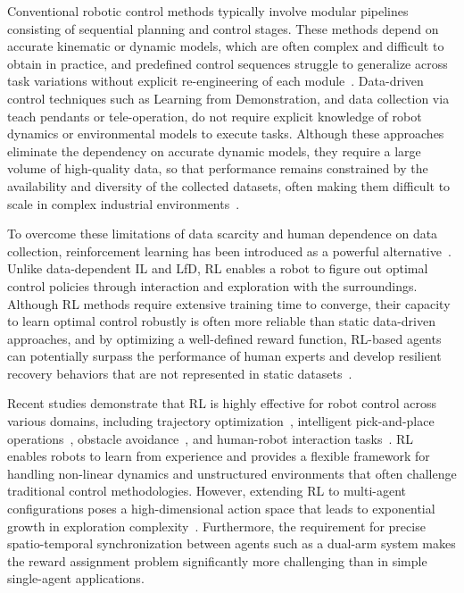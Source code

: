 Conventional robotic control methods typically involve modular pipelines consisting of sequential
planning and control stages. These methods depend on accurate kinematic or dynamic models, which are
often complex and difficult to obtain in practice, and predefined control sequences struggle to
generalize across task variations without explicit re-engineering of each module~\citep{he2023robotic}. Data-driven control techniques such as Learning from Demonstration, and data collection via teach pendants or tele-operation, do not require explicit knowledge of robot dynamics or environmental models to execute tasks. Although these approaches eliminate the dependency on accurate dynamic models, they require a large volume of high-quality data, so that performance remains constrained by the availability and diversity of the collected datasets, often making them difficult to scale in complex industrial environments~\citep{zhang2015towards}.

To overcome these limitations of data scarcity and human dependence on data collection,
reinforcement learning has been introduced as a powerful
alternative~\citep{kober2013reinforcement}. Unlike data-dependent IL and LfD, RL enables a robot to
figure out optimal control policies through interaction and exploration with the surroundings.
Although RL methods require extensive training time to converge, their capacity to learn optimal
control robustly is often more reliable than static data-driven approaches, and by optimizing a
well-defined reward function, RL-based agents can potentially surpass the performance of human
experts and develop resilient recovery behaviors that are not represented in static
datasets~\citep{zare2024survey, brune2025deep, gu2017deep}.

Recent studies demonstrate that RL is highly effective for robot control across various domains,
including trajectory optimization~\citep{majumder2024enhancing, mao2025real}, intelligent pick-and-place operations~\citep{deng2019deep, mehta2024waypoint}, obstacle avoidance~\citep{zhu2022robot, al2024reinforcement}, and human-robot interaction tasks~\citep{qureshi2018intrinsically, zhang2022reinforcement}. RL enables robots to learn from experience and provides a flexible framework for handling non-linear dynamics and unstructured environments that often challenge traditional control methodologies. However, extending RL to multi-agent configurations poses a high-dimensional action space that leads to exponential growth in exploration complexity~\citep{low2025cooperative, nguyen2020deep}. Furthermore, the requirement for precise spatio-temporal synchronization between agents such as a dual-arm system makes the reward assignment problem significantly more challenging than in simple single-agent applications.

